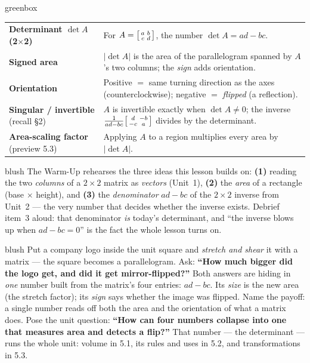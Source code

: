 \documentclass[10pt]{article}
\begin{document}
\begin{skillbox}{greenbox}
\renewcommand{\arraystretch}{1.3}
\begin{tabularx}{\linewidth}{@{}l X@{}}
\textbf{Determinant $\det A$ (2$\times$2)} & For $A=\begin{bsmallmatrix} a & b\\ c & d \end{bsmallmatrix}$, the number $\det A=ad-bc$. \\
\textbf{Signed area} & $|\det A|$ is the area of the parallelogram spanned by $A$'s two columns; the \emph{sign} adds orientation. \\
\textbf{Orientation} & Positive $=$ same turning direction as the axes (counterclockwise); negative $=$ \emph{flipped} (a reflection). \\
\textbf{Singular / invertible} (recall §2) & $A$ is invertible exactly when $\det A\ne0$; the inverse $\frac{1}{ad-bc}\begin{bsmallmatrix} d & -b\\ -c & a \end{bsmallmatrix}$ divides by the determinant. \\
\textbf{Area-scaling factor} (preview 5.3) & Applying $A$ to a region multiplies every area by $|\det A|$. \\
\end{tabularx}
\end{skillbox}

\begin{fixedskillbox}{blush}
    The Warm-Up rehearses the three ideas this lesson builds on:
    \textbf{(1)} reading the two \emph{columns} of a $2\times2$ matrix as \emph{vectors} (Unit~1),
    \textbf{(2)} the \emph{area} of a rectangle (base $\times$ height), and
    \textbf{(3)} the \emph{denominator} $ad-bc$ of the $2\times2$ inverse from Unit~2 --- the very
    number that decides whether the inverse exists. Debrief item~3 aloud: that denominator
    \emph{is} today's determinant, and ``the inverse blows up when $ad-bc=0$'' is the fact the
    whole lesson turns on.
\end{fixedskillbox}

\begin{skillbox}[Hook]{blush}
    Put a company logo inside the unit square and \emph{stretch and shear} it with a matrix --- the
    square becomes a parallelogram. Ask: \textbf{``How much bigger did the logo get, and did it get
    mirror-flipped?''} Both answers are hiding in \emph{one} number built from the matrix's four
    entries: $ad-bc$. Its \emph{size} is the new area (the stretch factor); its \emph{sign} says
    whether the image was flipped. Name the payoff: a single number reads off both the area and the
    orientation of what a matrix does. Pose the unit question: \textbf{``How can four numbers collapse
    into one that measures area and detects a flip?''} That number --- the determinant --- runs the
    whole unit: volume in 5.1, its rules and uses in 5.2, and transformations in 5.3.
\end{skillbox}
\end{document}
